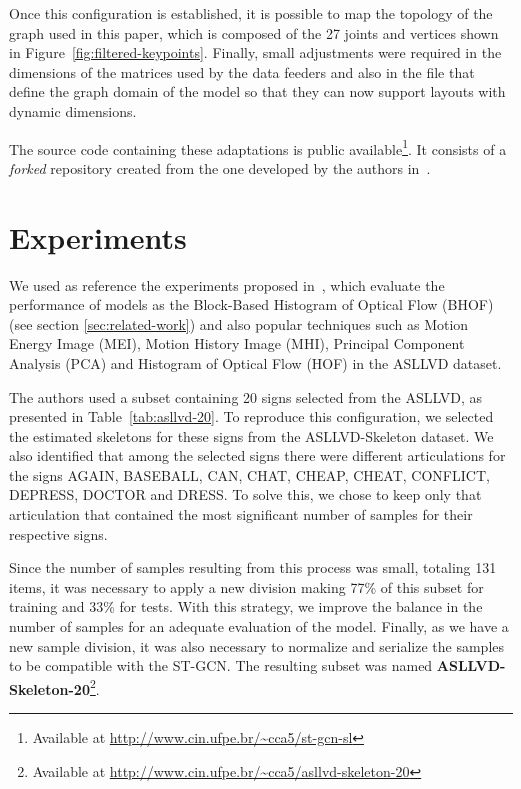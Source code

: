 Once this configuration is established, it is possible to map the topology of the graph used in this paper, which is composed of the 27 joints and vertices shown in  Figure~\ref{fig:filtered-keypoints}. Finally, small adjustments were required in the dimensions of the matrices used by the data feeders and also in the file
that define the graph domain of the model so that they can now support layouts with dynamic dimensions.

The source code containing these adaptations is public available\footnote{
    Available at \url{http://www.cin.ufpe.br/~cca5/st-gcn-sl}
}. It consists of a \textit{forked} repository created from the one developed by the authors in~\cite{st-gcn-2018}. \\[-8mm]


\section{Experiments} 
\label{sec:experiments}

We used as reference the experiments proposed in~\cite{lim-2016}, which evaluate the performance of models as the Block-Based Histogram of Optical Flow (BHOF) (see section \ref{sec:related-work}) and also popular techniques such as Motion Energy Image (MEI), Motion History Image (MHI), Principal Component Analysis (PCA) and Histogram of Optical Flow (HOF) in the ASLLVD dataset.

The authors used a subset containing 20 signs selected from the ASLLVD, as presented in Table~\ref{tab:asllvd-20}. To reproduce this configuration, we selected the estimated skeletons for these signs from the ASLLVD-Skeleton dataset. 
We also identified that among the selected signs there were different articulations for the signs AGAIN, BASEBALL, CAN, CHAT, CHEAP, CHEAT, CONFLICT, DEPRESS, DOCTOR and DRESS. To solve this, we chose to keep only that articulation that contained the most significant number of samples for their respective signs.

Since the number of samples resulting from this process was small, totaling 131 items, it was necessary to apply a new division making 77\% of this subset for training and 33\% for tests. With this strategy, we improve the balance in the number of samples for an adequate evaluation of the model. Finally, as we have a new sample division, it was also necessary to normalize and serialize the samples to be compatible with the ST-GCN. 
The resulting subset was named \textbf{ASLLVD-Skeleton-20}\footnote{ Available at \url{http://www.cin.ufpe.br/~cca5/asllvd-skeleton-20} }.\\[-10mm]

